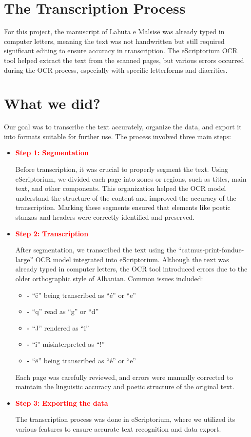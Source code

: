 \documentclass[12pt]{article}
\begin{document}
\section*{The Transcription Process}
For this project, the manuscript of Lahuta e Malsisë was already typed in computer letters, meaning the text was not handwritten but still required significant editing to ensure accuracy in transcription. The eScriptorium OCR tool helped extract the text from the scanned pages, but various errors occurred during the OCR process, especially with specific letterforms and diacritics.

\section*{What we did?}
Our goal was to transcribe the text accurately, organize the data, and export it into formats suitable for further use. The process involved three main steps: 

\begin{itemize}[label=\textcolor{red}{\textbullet}]
    \item\textcolor{red}{\textbf{Step 1: Segmentation}}
    
Before transcription, it was crucial to properly segment the text. Using eScriptorium, we divided each page into zones or regions, such as titles, main text, and other components. This organization helped the OCR model understand the structure of the content and improved the accuracy of the transcription. Marking these segments ensured that elements like poetic stanzas and headers were correctly identified and preserved.

    \item\textcolor{red}{\textbf{Step 2: Transcription}}
    
After segmentation, we transcribed the text using the “catmus-print-fondue-large” OCR model integrated into eScriptorium. Although the text was already typed in computer letters, the OCR tool introduced errors due to the older orthographic style of Albanian. Common issues included:

    \begin{itemize}[label={}]
        \item{\textbf{-} “ë” being transcribed as “é” or “e”}
        \item{\textbf{-} “q” read as “g” or “d”}
        \item{\textbf{-} “J” rendered as “i”}
        \item{\textbf{-} “i” misinterpreted as “!”}
        \item{\textbf{-} “ë” being transcribed as “é” or “e”}
    \end{itemize}
Each page was carefully reviewed, and errors were manually corrected to maintain the linguistic accuracy and poetic structure of the original text.

    \item\textcolor{red}{\textbf{Step 3: Exporting the data}}
    
The transcription process was done in eScriptorium, where we utilized its various features to ensure accurate text recognition and data export.

\end{itemize}
\end{document}
